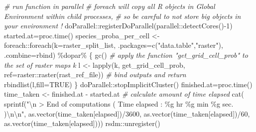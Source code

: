 \documentclass[
]{article}
\newenvironment{Shaded}{\begin{snugshade}}{\end{snugshade}}
\newcommand{\AttributeTok}[1]{\textcolor[rgb]{0.77,0.63,0.00}{#1}}
\newcommand{\CommentTok}[1]{\textcolor[rgb]{0.56,0.35,0.01}{\textit{#1}}}
\newcommand{\ConstantTok}[1]{\textcolor[rgb]{0.00,0.00,0.00}{#1}}
\newcommand{\DecValTok}[1]{\textcolor[rgb]{0.00,0.00,0.81}{#1}}
\newcommand{\FunctionTok}[1]{\textcolor[rgb]{0.00,0.00,0.00}{#1}}
\newcommand{\NormalTok}[1]{#1}
\newcommand{\OtherTok}[1]{\textcolor[rgb]{0.56,0.35,0.01}{#1}}
\newcommand{\SpecialCharTok}[1]{\textcolor[rgb]{0.00,0.00,0.00}{#1}}
\newcommand{\StringTok}[1]{\textcolor[rgb]{0.31,0.60,0.02}{#1}}
\begin{document}
\begin{Shaded}
\begin{Highlighting}[]
\CommentTok{\# run function in parallel}
\CommentTok{\# foreach will copy all R objects in Global Environment within child processes,}
\CommentTok{\# so be careful to not store big objects in your environment !}
\NormalTok{doParallel}\SpecialCharTok{::}\FunctionTok{registerDoParallel}\NormalTok{(parallel}\SpecialCharTok{::}\FunctionTok{detectCores}\NormalTok{()}\SpecialCharTok{{-}}\DecValTok{1}\NormalTok{)}
\NormalTok{started.at}\OtherTok{=}\FunctionTok{proc.time}\NormalTok{()}
\NormalTok{species\_proba\_per\_cell }\OtherTok{\textless{}{-}}\NormalTok{ foreach}\SpecialCharTok{::}\FunctionTok{foreach}\NormalTok{(}\AttributeTok{k=}\NormalTok{raster\_split\_list,}
                                              \AttributeTok{.packages=}\FunctionTok{c}\NormalTok{(}\StringTok{"data.table"}\NormalTok{,}\StringTok{"raster"}\NormalTok{),}
                                              \AttributeTok{.combine=}\StringTok{\textquotesingle{}rbind\textquotesingle{}}\NormalTok{) }\SpecialCharTok{\%dopar\%}\NormalTok{ \{}
  \FunctionTok{gc}\NormalTok{()}
  \CommentTok{\# apply the function "get\_grid\_cell\_prob" to the set of raster maps k}
\NormalTok{  l }\OtherTok{\textless{}{-}} \FunctionTok{lapply}\NormalTok{(k, get\_grid\_cell\_prob, }\AttributeTok{ref=}\NormalTok{raster}\SpecialCharTok{::}\FunctionTok{raster}\NormalTok{(rast\_ref\_file))}
  \CommentTok{\# bind outputs and return}
  \FunctionTok{rbindlist}\NormalTok{(l,}\AttributeTok{fill=}\ConstantTok{TRUE}\NormalTok{)}
\NormalTok{\}}
\NormalTok{doParallel}\SpecialCharTok{::}\FunctionTok{stopImplicitCluster}\NormalTok{()}
\NormalTok{finished.at}\OtherTok{=}\FunctionTok{proc.time}\NormalTok{()}
\NormalTok{time\_taken }\OtherTok{\textless{}{-}}\NormalTok{ finished.at }\SpecialCharTok{{-}}\NormalTok{ started.at }\CommentTok{\# calculate amount of time elapsed}
\FunctionTok{cat}\NormalTok{(}
  \FunctionTok{sprintf}\NormalTok{(}\StringTok{"}\SpecialCharTok{\textbackslash{}n}\StringTok{ \textgreater{} End of computations ( Time elapsed : \%g hr \%g min \%g sec. )}\SpecialCharTok{\textbackslash{}n\textbackslash{}n}\StringTok{"}\NormalTok{,}
          \FunctionTok{as.vector}\NormalTok{(time\_taken[}\StringTok{\textquotesingle{}elapsed\textquotesingle{}}\NormalTok{])}\SpecialCharTok{/}\DecValTok{3600}\NormalTok{, }\FunctionTok{as.vector}\NormalTok{(time\_taken[}\StringTok{\textquotesingle{}elapsed\textquotesingle{}}\NormalTok{])}\SpecialCharTok{/}\DecValTok{60}\NormalTok{,}
          \FunctionTok{as.vector}\NormalTok{(time\_taken[}\StringTok{\textquotesingle{}elapsed\textquotesingle{}}\NormalTok{])))}
\NormalTok{rsdm}\SpecialCharTok{::}\FunctionTok{unregister}\NormalTok{()}


\end{Highlighting}
\end{Shaded}
\end{document}
